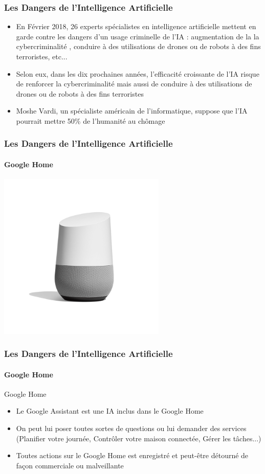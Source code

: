 \documentclass{beamer}
\begin{document}
	\begin{frame}
	\frametitle{Les Dangers de l'Intelligence Artificielle}
	\begin{itemize}
	\itemsep1em
		\item En Février 2018, 26 experts spécialistes en intelligence artificielle mettent en garde contre les dangers d'un usage criminelle de l'IA : augmentation de la la cybercriminalité , conduire à des utilisations de drones ou de robots à des fins terroristes, etc...
		\item Selon eux, dans les dix prochaines années, l'efficacité croissante de l'IA risque de renforcer la cybercriminalité mais aussi de conduire à des utilisations de drones ou de robots à des fins terroristes
		\item Moshe Vardi, un spécialiste américain de l'informatique, suppose que l'IA pourrait mettre 50\% de l'humanité au chômage
		\end{itemize}
	\end{frame}

	\begin{frame}
	\frametitle{Les Dangers de l'Intelligence Artificielle}
	\framesubtitle{Google Home}
	\centerline{\includegraphics[height=8cm]{googlehome.png}}
	\end{frame}
	
	\begin{frame}
	\frametitle{Les Dangers de l'Intelligence Artificielle}
	\framesubtitle{Google Home}
	\begin{block}{Google Home}
	\begin{itemize}
	\itemsep1em
		\item Le Google Assistant est une IA inclus dans le Google Home
		\item On peut lui poser toutes sortes de questions ou lui demander des services (Planifier votre journée, Contrôler votre maison connectée, Gérer les tâches...)
		\item Toutes actions sur le Google Home est enregistré et peut-être détourné de façon commerciale ou malveillante
	\end{itemize}
	\end{block}
	\end{frame}
	
\end{document}
